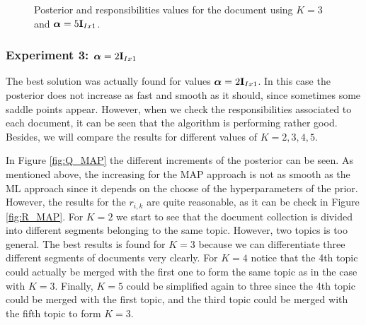 \documentclass[12pt]{article}
\begin{document}
\begin{figure}[h!]
\begin{subfigure}{0.4\textwidth}
		\caption{}
		\label{fig:R_MAP_5al}
	\end{subfigure}
	\caption{Posterior and responsibilities values for the document using $K = 3$ and $\boldsymbol\alpha = 5\mathbf{I}_{Ix1}$.}
	\label{fig:MAP_5al}
\end{figure}

\subsubsection{Experiment 3: $\boldsymbol\alpha = 2\mathbf{I}_{Ix1}$}\label{experiment3}

The best solution was actually found for values  $\boldsymbol\alpha = 2\mathbf{I}_{Ix1}$. In this case the posterior does not increase as fast and smooth as it should, since sometimes some saddle points appear. However, when we check the responsibilities associated to each document, it can be seen that the algorithm is performing rather good. Besides, we will compare the results for different values of $K= 2,3,4,5$.

In Figure \ref{fig:Q_MAP} the different increments of the posterior can be seen. As mentioned above, the increasing for the MAP approach is not as smooth as the ML approach since it depends on the choose of the hyperparameters of the prior. However, the results for the $r_{i,k}$ are quite reasonable, as it can be check in Figure \ref{fig:R_MAP}. For $K=2$ we start to see that the document collection is divided into different segments belonging to the same topic. However, two topics is too general. The best results is found for $K=3$ because we can differentiate three different segments of documents very clearly. For $K=4$ notice that the 4th topic could actually be merged with the first one to form the same topic as in the case with $K=3$. Finally, $K=5$ could be simplified again to three since the 4th topic could be merged with the first topic, and the third topic could be merged with the fifth topic to form $K=3$.
\end{document}
